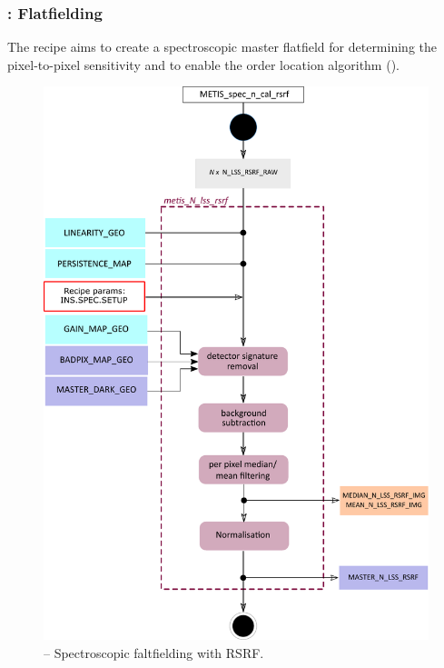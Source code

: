\subsubsection{:  Flatfielding}\label{rec:metis_n_lss_rsrf}
The recipe  aims to create a spectroscopic master flatfield for determining the pixel-to-pixel sensitivity and to enable the order location algorithm ().
\begin{figure}[ht]
  \centering
  \includegraphics[width=0.5\textheight]{figures/metis_n_lss_rsrf_v0.83.pdf}
  \caption[Recipe: ]{ --
    Spectroscopic faltfielding with \ac{RSRF}.}
  \label{Fig:rec_n_lss_rsrf}
\end{figure}

